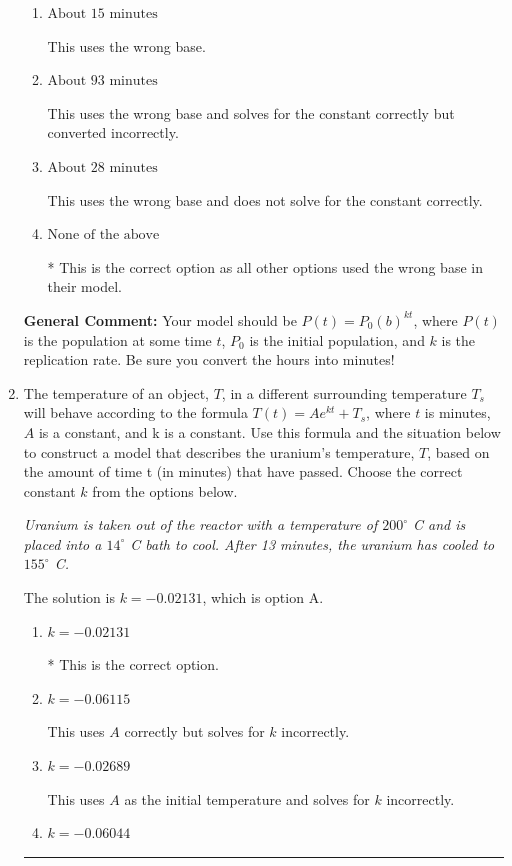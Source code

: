 \documentclass{extbook}[14pt]
\newcommand{\litem}[1]{\item #1

\rule{\textwidth}{0.4pt}}
\begin{document}
\begin{enumerate}
{\begin{enumerate}[label=\Alph*.]
This uses the wrong base, does not solve for the constant correctly, AND converted incorrectly.
\item \( \text{About } 15 \text{ minutes} \)

This uses the wrong base.
\item \( \text{About } 93 \text{ minutes} \)

This uses the wrong base and solves for the constant correctly but converted incorrectly.
\item \( \text{About } 28 \text{ minutes} \)

This uses the wrong base and does not solve for the constant correctly.
\item \( \text{None of the above} \)

* This is the correct option as all other options used the wrong base in their model.
\end{enumerate}

\textbf{General Comment:} Your model should be $P(t) = P_0(b)^{kt}$, where $P(t)$ is the population at some time $t$, $P_0$ is the initial population, and $k$ is the replication rate. Be sure you convert the hours into minutes!
}
\litem{
The temperature of an object, $T$, in a different surrounding temperature $T_s$ will behave according to the formula $T(t) = Ae^{kt} + T_s$, where $t$ is minutes, $A$ is a constant, and k is a constant. Use this formula and the situation below to construct a model that describes the uranium's temperature, $T$, based on the amount of time t (in minutes) that have passed. Choose the correct constant $k$ from the options below.

\begin{center}
    \textit{ Uranium is taken out of the reactor with a temperature of $200^{\circ}$ C and is placed into a $14^{\circ}$ C bath to cool. After 13 minutes, the uranium has cooled to $155^{\circ}$ C. }
\end{center}
The solution is \( k = -0.02131 \), which is option A.\begin{enumerate}[label=\Alph*.]
\item \( k = -0.02131 \)

* This is the correct option.
\item \( k = -0.06115 \)

This uses $A$ correctly but solves for $k$ incorrectly.
\item \( k = -0.02689 \)

This uses $A$ as the initial temperature and solves for $k$ incorrectly.
\item \( k = -0.06044 \)


\end{enumerate}}
\end{enumerate}
\end{document}
